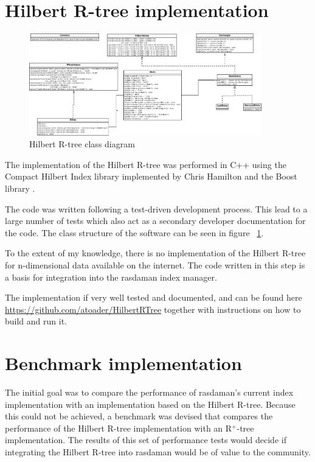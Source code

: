 \documentclass[11pt, a4paper, oneside]{article}
\newcommand{\rtree}{R$^+$-tree$\,$}
\begin{document}
\section{Hilbert R-tree implementation}
\label{sec:hrtree}

\begin{figure}
  \centering
    \includegraphics[width=0.9\textwidth]{img/ClassDiagram.png}
      \caption{Hilbert R-tree class diagram}
  \label{fig:class_diagram}
\end{figure}


The implementation of the Hilbert R-tree was performed in C++ using the Compact Hilbert Index library\cite{libhilbert} implemented by Chris Hamilton and the Boost library \cite{boost}.

The code was written following a test-driven development process. This lead to a large number of tests which also act as a secondary developer documentation for the code.
The class structure of the software can be seen in figure ~\ref{fig:class_diagram}.

To the extent of my knowledge, there is no implementation of the Hilbert R-tree for n-dimensional data available on the internet. The code written in this step is a basis for integration into the rasdaman index manager.

The implementation if very well tested and documented, and can be found here \url{https://github.com/atoader/HilbertRTree} together with instructions on how to build and run it.
\section{Benchmark implementation}
\label{sec:benchmark}
The initial goal was to compare the performance of rasdaman's current index implementation with an implementation based on the Hilbert R-tree. Because this could not be achieved, a benchmark was devised that compares the performance of the Hilbert R-tree implementation with an \rtree  implementation. The results of this set of performance tests would decide if integrating the Hilbert R-tree into rasdaman would be of value to the community.
\end{document}
